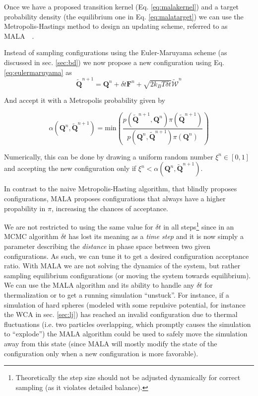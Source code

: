 \documentclass[twoside,openright,titlepage,numbers=noenddot,%
headinclude,footinclude,cleardoublepage=empty,abstract=on,
BCOR=5mm,fontsize=11pt, dvipsnames, paper=b5
]{scrreprt}
\renewcommand{\vec}[1]{\bm{#1}}
\newcommand{\dt}{\delta t}
\newcommand{\kT}{k_B T}
\begin{document}
Once we have a proposed transition kernel (Eq. \eqref{eq:malakernel}) and a target probability density (the equilibrium one in Eq. \eqref{eq:malatarget}) we can use the Metropolis-Hastings method to design an updating scheme, referred to as MALA~\cite{Roberts1996}~\cite{Besag1994}.

Instead of sampling configurations using the Euler-Maruyama scheme (as discussed in sec. \ref{sec:bd}) we now propose a new configuration using Eq. \eqref{eq:eulermaruyama} as
\begin{equation}
  \widetilde{\vec{Q}}^{n+1} = \vec{Q}^n + \dt\vec{F}^n + \sqrt{2\kT\dt}\vec{\widetilde{\mathcal{W}}}^n
\end{equation}

And accept it with a Metropolis probability given by

\begin{equation}
  \alpha(\vec{Q}^n, \widetilde{\vec{Q}}^{n+1}) = \text{min}\left(\frac{p(\widetilde{\vec{Q}}^{n+1},\vec{Q}^{n})\pi(\widetilde{\vec{Q}}^{n+1})}{p(\vec{Q}^{n}, \widetilde{\vec{Q}}^{n+1})\pi(\vec{Q}^{n})}\right)
\end{equation}

Numerically, this can be done by drawing a uniform random number $\xi^n \in [0,1]$ and accepting the new configuration only if $\xi^n<\alpha(\vec{Q}^n, \widetilde{\vec{Q}}^{n+1})$.

In contrast to the naive Metropolis-Hasting algorithm, that blindly proposes configurations, MALA proposes configurations that always have a higher propability in $\pi$, increasing the chances of acceptance.

We are not restricted to using the same value for $\dt$ in all steps\footnote{Theoretically the step size should not be adjusted dynamically for correct sampling (as it violates detailed balance).} since in an MCMC algorithm $\dt$ has lost its meaning as a \emph{time step} and it is now simply a parameter describing the \emph{distance} in phase space between two given configurations. As such, we can tune it to get a desired configuration acceptance ratio.
With MALA we are not solving the dynamics of the system, but rather sampling equilibrium configurations (or moving the system towards equilibrium). We can use the MALA algorithm and its ability to handle any $\dt$ for thermalization or to get a running simulation ``unstuck''. For instance, if a simulation of hard spheres (modeled with some repulsive potential, for instance the WCA in sec. \ref{sec:lj}) has reached an invalid configuration due to thermal fluctuations (i.e. two particles overlapping, which promptly causes the simulation to ``explode'') the MALA algorithm could be used to safely move the simulation away from this state (since MALA will mostly modify the state of the configuration only when a new configuration is more favorable).
\end{document}
